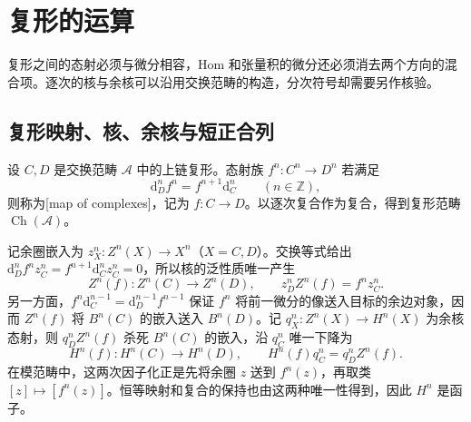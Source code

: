 
\section{复形的运算}
\label{b4:sec:0502}

复形之间的态射必须与微分相容，Hom 和张量积的微分还必须消去两个方向的混合项。逐次的核与余核可以沿用交换范畴的构造，分次符号却需要另作核验。

%
%

\subsection{复形映射、核、余核与短正合列}
\label{b4:subsec:0502:01}

\begin{definition}\label{b4:def:complex-map}
	设 \(C,D\) 是交换范畴 \(\mathcal A\) 中的上链复形。态射族 \(f^n:C^n\to D^n\) 若满足
	\[
		\mathrm{d}_D^nf^n=f^{n+1}\mathrm{d}_C^n\qquad(n\in\mathbb Z),
	\]
	则称为[map of complexes]，记为 \(f:C\to D\)。以逐次复合作为复合，得到复形范畴 \(\operatorname{Ch}(\mathcal A)\)。
\end{definition}

记余圈嵌入为 \(z_X^n:Z^n(X)\to X^n\)（\(X=C,D\)）。交换等式给出 \(\mathrm{d}_D^nf^nz_C^n=f^{n+1}\mathrm{d}_C^nz_C^n=0\)，所以核的泛性质唯一产生
\[
	Z^n(f):Z^n(C)\longrightarrow Z^n(D), \qquad z_D^nZ^n(f)=f^nz_C^n.
\]
另一方面，\(f^n\mathrm{d}_C^{n-1}=\mathrm{d}_D^{n-1}f^{n-1}\) 保证 \(f^n\) 将前一微分的像送入目标的余边对象，因而 \(Z^n(f)\) 将 \(B^n(C)\) 的嵌入送入 \(B^n(D)\)。记 \(q_X^n:Z^n(X)\to H^n(X)\) 为余核态射，则 \(q_D^nZ^n(f)\) 杀死 \(B^n(C)\) 的嵌入，沿 \(q_C^n\) 唯一下降为
\[
	H^n(f):H^n(C)\longrightarrow H^n(D), \qquad H^n(f)q_C^n=q_D^nZ^n(f).
\]
在模范畴中，这两次因子化正是先将余圈 \(z\) 送到 \(f^n(z)\)，再取类 \([z]\mapsto[f^n(z)]\)。恒等映射和复合的保持也由这两种唯一性得到，因此 \(H^n\) 是函子。

